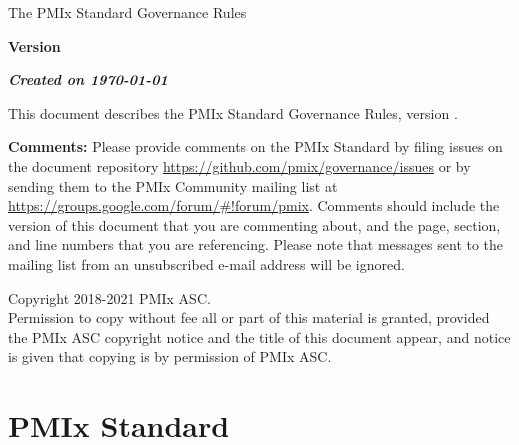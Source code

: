 \documentclass{article}
\newcommand{\VERDATE}{\emph{Created on \today}}
\newcommand{\VERDATE}{Month Year}
\begin{document}
\thispagestyle{empty}

\begin{titlepage}

\begin{center}
  \Huge \textsf{The PMIx Standard Governance Rules}

  \vspace{1.0in}

  \huge \textbf{Version \VER{}}

  \vspace{0.15in}

  \Large \textbf{\VERDATE}

\end{center}

\vspace{1.2in}

\vfill

\par
This document describes the PMIx Standard Governance Rules, version \VER{}.

\vspace{1em}

\textbf{Comments:}
Please provide comments on the PMIx Standard by filing issues on the document repository \url{https://github.com/pmix/governance/issues} or by sending them to the PMIx Community mailing list at \url{https://groups.google.com/forum/#!forum/pmix}.
Comments should include the version of this document that you are commenting about, and the page, section, and line numbers that you are referencing.
Please note that messages sent to the mailing list from an unsubscribed e-mail address will be ignored.

\vspace{1em}

Copyright\textsuperscript{\textcopyright} 2018-2021 PMIx \acf{ASC}.\\
Permission to copy without fee all or part of this material is granted,
provided the PMIx \ac{ASC} copyright notice and
the title of this document appear, and notice is given that copying is by
permission of PMIx \ac{ASC}.

\end{titlepage}

\newpage

\tableofcontents
\newpage

\hypertarget{pmix-standard}{%
\section{PMIx Standard}%
\label{pmix-standard}}
\end{document}
